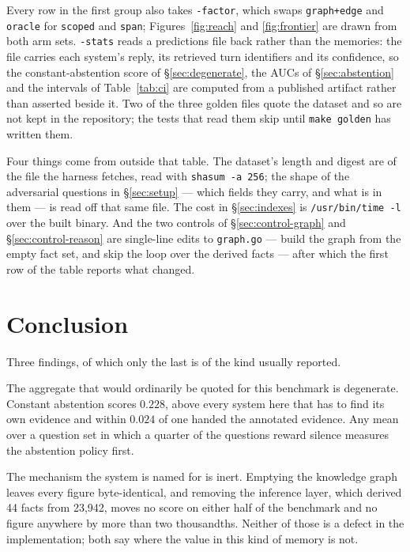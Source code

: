 \documentclass[11pt]{article}
\newcommand{\arm}[1]{\texttt{#1}}
\begin{document}
Every row in the first group also takes \texttt{-factor}, which swaps
\arm{graph+edge} and \arm{oracle} for \arm{scoped} and \arm{span};
Figures~\ref{fig:reach} and \ref{fig:frontier} are drawn from both arm sets.
\texttt{-stats} reads a predictions file back rather than the memories: the file
carries each system's reply, its retrieved turn identifiers and its confidence,
so the constant-abstention score of \S\ref{sec:degenerate}, the AUCs of
\S\ref{sec:abstention} and the intervals of Table~\ref{tab:ci} are computed from
a published artifact rather than asserted beside it. Two of the three golden
files quote the dataset and so are not kept in the repository; the tests that
read them skip until \texttt{make golden} has written them.

Four things come from outside that table. The dataset's length and digest are of
the file the harness fetches, read with \texttt{shasum -a 256}; the shape of the
adversarial questions in \S\ref{sec:setup} --- which fields they carry, and what
is in them --- is read off that same file. The cost in \S\ref{sec:indexes} is
\texttt{/usr/bin/time -l} over the built binary. And the two controls of
\S\ref{sec:control-graph} and \S\ref{sec:control-reason} are single-line edits
to \texttt{graph.go} --- build the graph from the empty fact set, and skip the
loop over the derived facts --- after which the first row of the table reports
what changed.

\section{Conclusion}
\label{sec:conclusion}

Three findings, of which only the last is of the kind usually reported.

The aggregate that would ordinarily be quoted for this benchmark is degenerate.
Constant abstention scores $0.228$, above every system here that has to find its
own evidence and within $0.024$ of one handed the annotated evidence. Any mean
over a question set in which a quarter of the questions reward silence measures
the abstention policy first.

The mechanism the system is named for is inert. Emptying the knowledge graph
leaves every figure byte-identical, and removing the inference layer, which
derived 44 facts from 23{,}942, moves no score on either half of the benchmark
and no figure anywhere by more than two thousandths. Neither of those is a
defect in the implementation; both say where the value in this kind of memory is
not.
\end{document}
